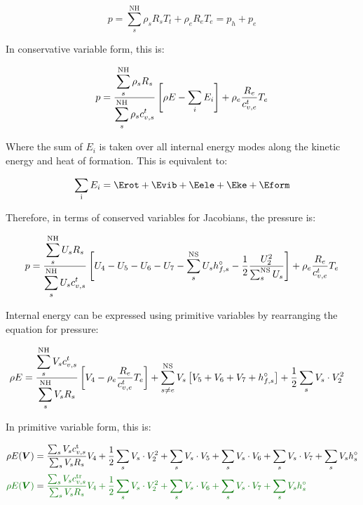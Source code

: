 \documentclass[10pt]{article}
\begin{document}
\begin{flushleft}
\begin{equation*}
    p = \sum_{s}^\text{NH} \rho_s R_s T_t + \rho_e R_e T_e = p_h + p_e
\end{equation*}

In conservative variable form, this is:

\begin{equation*}
    p = \frac{\displaystyle \sum_s^\text{NH} \rho_s R_s }{\displaystyle \sum_s^\text{NH} \rho_s c_{v,s}^t} \left[ \rho E - \sum_i E_i \right] + \rho _e \frac{R_e}{c_{v,e}^t} T_e
\end{equation*}

Where the sum of $E_i$ is taken over all internal energy modes along the kinetic energy and heat of formation. This is equivalent to:

\begin{equation*}
    \sum_\text{i} E_i = \Erot + \Evib + \Eele + \Eke + \Eform
\end{equation*}

Therefore, in terms of conserved variables for Jacobians, the pressure is:

\begin{equation*}
    p = \frac{\displaystyle \sum_s^\text{NH} U_s R_s }{\displaystyle \sum_s^\text{NH} U_s c_{v,s}^t} \left[ U_4 - U_5 - U_6 - U_7 - \sum_s^\text{NS} U_s h_{f,s}^\circ - \frac{1}{2} \frac{U_2^2}{\sum_s^\text{NS} U_s} \right] + \rho_e \frac{R_e}{c_{v,e}^t} T_e
\end{equation*}

Internal energy can be expressed using primitive variables by rearranging the equation for pressure:

\begin{align*}
    \rho E &= \frac{\displaystyle \sum_s^\text{NH} V_s c_{v,s}^t}{\displaystyle \sum_s^\text{NH} V_s R_s } \left[ V_4 - \rho_e \frac{R_e}{c_{v,e}^t} T_e \right] + \sum_{s \neq e}^\text{NS} V_s \left[ V_5 + V_6 + V_7 + h_{f,s}^\circ \right] + \frac{1}{2} \sum_s V_s \cdot V_2^2
\end{align*}

In primitive variable form, this is:

\begin{align*}
    \rho E(\boldsymbol{V}) &= \frac{\sum_s V_s c_{v,s}^\text{t}}{\sum_s V_s R_s} V_4 + \frac{1}{2} \sum_s V_s \cdot V_2^2 + \sum_s V_s \cdot V_5 + \sum_s V_s \cdot V_6 + \sum_s V_s \cdot V_7 + \sum_s V_s h_s^\circ \\
    \textcolor{defgreen}{\rho E(\boldsymbol{V})} &= \textcolor{defgreen}{\frac{\sum_s V_s c_{v,s}^\text{tr}}{\sum_s V_s R_s} V_4 + \frac{1}{2} \sum_s V_s \cdot V_2^2 + \sum_s V_s \cdot V_6 + \sum_s V_s \cdot V_7 + \sum_s V_s h_s^\circ}
\end{align*}


\end{flushleft}
\end{document}
